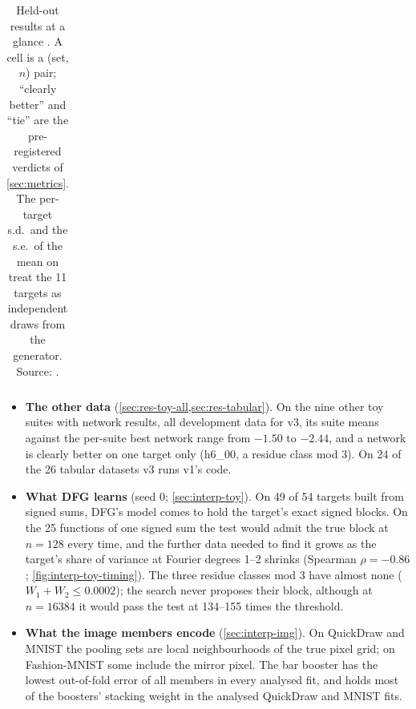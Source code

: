 \begin{table}[t]
\begin{tabularx}{\linewidth}{>{\raggedright\arraybackslash}p{2.0cm}>{\raggedright\arraybackslash}p{2.6cm}>{\raggedright\arraybackslash}X>{\raggedright\arraybackslash}p{1.95cm}>{\raggedright\arraybackslash}p{3.2cm}}
\bottomrule
\end{tabularx}
\caption{Held-out results at a glance . A cell is a (set, $n$) pair; ``clearly better'' and ``tie'' are the pre-registered verdicts of \cref{sec:metrics}. The per-target s.d.\ and the s.e.\ of the mean on  treat the 11 targets as independent draws from the generator. Source: .}
\label{tab:headline}
\end{table}

\begin{itemize}
\item \textbf{The other data}  (\cref{sec:res-toy-all,sec:res-tabular}). On the nine other toy suites with network results, all development data for v3, its suite means against the per-suite best network range from $-1.50$ to $-2.44$, and a network is clearly better on one target only (h6\_00, a residue class mod 3). On 24 of the 26 tabular datasets v3 runs v1's code.
\item \textbf{What DFG learns}  (seed 0; \cref{sec:interp-toy}). On 49 of 54 targets built from signed sums, DFG's model comes to hold the target's exact signed blocks. On the 25 functions of one signed sum the test would admit the true block at $n=128$ every time, and the further data needed to find it grows as the target's share of variance at Fourier degrees 1--2 shrinks (Spearman $\rho=-0.86$; \cref{fig:interp-toy-timing}). The three residue classes mod 3 have almost none ($W_1+W_2\le0.0002$); the search never proposes their block, although at $n=16384$ it would pass the test at 134--155 times the threshold.
\item \textbf{What the image members encode}  (\cref{sec:interp-img}). On QuickDraw and MNIST the pooling sets are local neighbourhoods of the true pixel grid; on Fashion-MNIST some include the mirror pixel. The bar booster has the lowest out-of-fold error of all members in every analysed fit, and holds most of the boosters' stacking weight in the analysed QuickDraw and MNIST fits.
\end{itemize}

